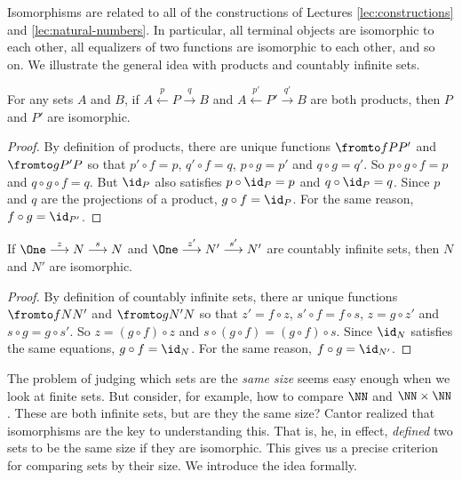 Isomorphisms are related to all of the constructions of Lectures \ref{lec:constructions} and \ref{lec:natural-numbers}. 
In particular, all terminal objects are isomorphic to each other, all equalizers of two functions are isomorphic to each other, and so on. 
We illustrate the general idea with products and countably infinite sets. 

\begin{lemma}
	For any sets $A$ and $B$, if $A\stackrel{p}{\longleftarrow}P\stackrel{q}{\longrightarrow}B$ and
	$A\stackrel{p'}{\longleftarrow}P'\stackrel{q'}{\longrightarrow}B$
	are both products, then $P$ and $P'$ are isomorphic.
	
	\begin{proof}
		By definition of products, there are unique functions $\fromto fP{P'}$
		and $\fromto g{P'}P$ so that $p'\circ f = p$, $q'\circ f=q$, 
		$p\circ g = p'$ and $q\circ g = q'$. So $p\circ g\circ f = p$
		and $q\circ g\circ f = q$. But $\id_P$ also satisfies $p\circ \id_P = p$
		and $q\circ \id_P = q$. Since $p$ and $q$ are the projections of a product,
		$g\circ f = \id_P$. For the same reason, $f\circ g = \id_{P'}$.
	\end{proof}
\end{lemma}

\begin{lemma}
	If $\One\stackrel{z}{\longrightarrow}N\stackrel{s}{\longrightarrow}N$ and $\One\stackrel{z'}{\longrightarrow}N'\stackrel{s'}{\longrightarrow}N'$ are countably infinite sets, then $N$ and $N'$ are isomorphic. 
	
	\begin{proof}
		By definition of countably infinite sets, there ar unique functions $\fromto fN{N'}$ and $\fromto g{N'}N$ so that $z'= f\circ z$, $s'\circ f=f\circ s$, $z=g\circ z'$ and $s\circ g=g\circ s'$.
		So $z = (g\circ f)\circ z$ and $s\circ (g\circ f) = (g\circ f)\circ s$.
		Since $\id_N$ satisfies the same equations, $g\circ f = \id_N$. For the same reason, $f\circ g = \id_{N'}$.
	\end{proof}
\end{lemma}

The problem of judging which sets are the \emph{same size} seems easy enough when we look at finite sets. But consider, for example, how to compare $\NN$ and $\NN\times \NN$. These are both infinite sets, but are they the same size?
Cantor realized that isomorphisms are the key to understanding this. That is,
he, in effect, \emph{defined} two sets to be the same size if they are isomorphic.
This gives us a precise criterion for comparing sets by their size. We introduce the idea formally.


